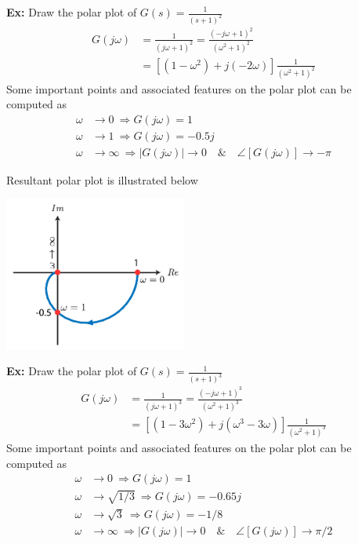 \documentclass{article}
\begin{document}
\vspace{6 pt}

\textbf{Ex:} Draw the polar plot of  $G(s) = \frac{1}{(s+1)^2}$
%
\begin{align*}
  G(j \omega ) &= \frac{1}{ (j \omega + 1)^2 } = \frac{ (-j \omega + 1)^2 }{( \omega^2 +1 )^2 }
\\
&= \left[ \left( 1 - \omega^2 \right) + j ( - 2 \omega) \right] \frac{1}{( \omega^2 +1 )^2 }
\end{align*}
%
Some important points and associated features on the polar plot can be computed as
\begin{align*}
  \omega &\to 0 \ \Rightarrow G(j \omega) = 1
\\
 \omega &\to 1 \ \Rightarrow G(j \omega) = -0.5 j 
\\
 \omega &\to  \infty \ \Rightarrow | G(j \omega) | \to 0 \quad \& \quad \angle  [ G(j \omega) ] \to -\pi
\end{align*}

Resultant polar plot is illustrated below

\vspace{6 pt}

  \begin{minipage}[h]{1\linewidth}
    \begin{center}
      \includegraphics[width=0.45\textwidth]{figs/polar4}
    \end{center}
  \end{minipage}

\vspace{6 pt}

\textbf{Ex:} Draw the polar plot of  $G(s) = \frac{1}{(s+1)^3}$
%
\begin{align*}
  G(j \omega ) &= \frac{1}{ (j \omega + 1)^3 } = \frac{ (-j \omega + 1)^3 }{( \omega^2 +1 )^3 }
\\
&= \left[ \left( 1 - 3 \omega^2 \right) + j (\omega^3 - 3 \omega) \right] \frac{1}{( \omega^2 +1 )^3 }
\end{align*}
%
Some important points and associated features on the polar plot can be computed as
\begin{align*}
  \omega &\to 0 \ \Rightarrow G(j \omega) = 1
\\
 \omega &\to \sqrt{1/3} \ \Rightarrow G(j \omega) = -0.65 j 
\\
 \omega &\to \sqrt{3} \ \Rightarrow G(j \omega) = -1/8
\\
 \omega &\to  \infty \ \Rightarrow | G(j \omega) | \to 0 \quad \& \quad \angle  [ G(j \omega) ] \to \pi/2
\end{align*}
\end{document}
